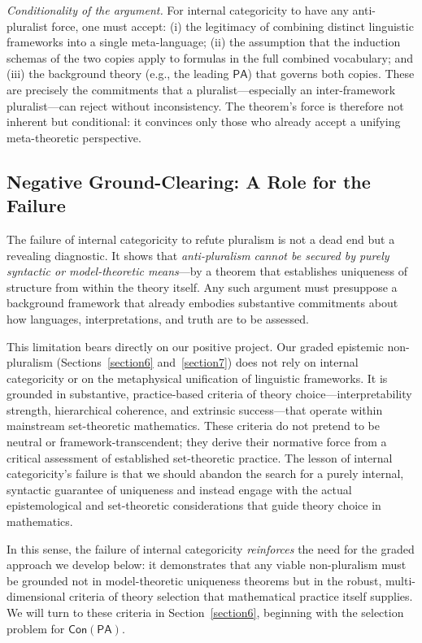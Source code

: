 \documentclass[a4paper,12pt]{amsart}
\theoremstyle{definition}
\numberwithin{equation}{section}
\begin{document}
\emph{Conditionality of the argument.} For internal categoricity to have any 
anti-pluralist force, one must accept: (i) the legitimacy of combining 
distinct linguistic frameworks into a single meta-language; (ii) the 
assumption that the induction schemas of the two copies apply to 
formulas in the full combined vocabulary; and (iii) the background 
theory (e.g., the leading $\mathsf{PA}$) that governs both copies. These are 
precisely the commitments that a pluralist---especially an 
inter-framework pluralist---can reject without inconsistency. The 
theorem's force is therefore not inherent but conditional: it convinces only those who already accept a unifying meta-theoretic perspective.
  
\subsection{Negative Ground-Clearing: A Role for the Failure}

The failure of internal categoricity to refute pluralism is not a dead end but a revealing diagnostic. It shows that \emph{anti-pluralism cannot be secured by purely syntactic or model-theoretic means}---by a theorem that establishes uniqueness of structure from within the theory itself. Any such argument must presuppose a background framework that already embodies substantive commitments about how languages, interpretations, and truth are to be assessed.

This limitation bears directly on our positive project. Our graded epistemic non-pluralism (Sections~\ref{section6} and~\ref{section7}) does not rely on internal categoricity or on the metaphysical unification of linguistic frameworks. It is grounded in substantive, practice-based criteria of theory choice---interpretability strength, hierarchical coherence, and extrinsic success---that operate within mainstream set-theoretic mathematics. These criteria do not pretend to be neutral or framework-transcendent; they derive their normative force from a critical assessment of established set-theoretic practice. The lesson of internal categoricity's failure is that we should abandon the search for a purely internal, syntactic guarantee of uniqueness and instead engage with the actual epistemological and set-theoretic considerations that guide theory choice in mathematics.

In this sense, the failure of internal categoricity \emph{reinforces} the need for the graded approach we develop below: it demonstrates that any viable non-pluralism must be grounded not in model-theoretic uniqueness theorems but in the robust, multi-dimensional criteria of theory selection that mathematical practice itself supplies. We will turn to these criteria in Section~\ref{section6}, beginning with the selection problem for \(\mathsf{Con}(\mathsf{PA})\).   
\end{document}
